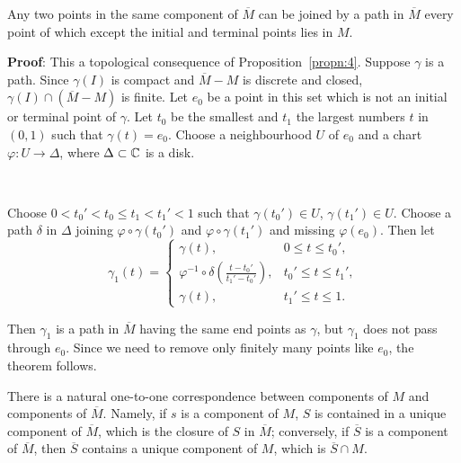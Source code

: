 \documentclass[a4paper,11pt]{article}
\begin{document}
\begin{propn}
  \label{propn:6}
  Any two points in the same component of $\overline{M}$ can be joined
  by a path in $\overline{M}$ every point of which except the initial
  and terminal points lies in $M$.
\end{propn}

\begin{mdframed}
  \textbf{Proof}: 
  This a topological consequence of Proposition~\ref{propn:4}.
  Suppose $\gamma$ is a path.  Since $\gamma(I)$ is compact and
  $\overline{M} - M$ is discrete and closed, $\gamma(I) \cap
  (\overline{M} - M)$ is finite.  Let $e_0$ be a point in this set
  which is not an initial or terminal point of $\gamma$.  Let $t_0$ be
  the smallest and $t_1$ the largest numbers $t$ in $(0,1)$ such that
  $\gamma(t) = e_0$.  Choose a neighbourhood $U$ of $e_0$ and a chart
  $\varphi : U \to \Delta$, where $\Delta \subset {\mathbb C}$ is a disk.

  \begin{center}
  \begin{minipage}{0.4\textwidth}
    ~
    \vspace*{4cm}
  \end{minipage}%
  \begin{minipage}{0.5\textwidth}
    Choose $0 < t_0' < t_0 \le t_1 < t_1' < 1$ such that $\gamma(t_0')
    \in U$, $\gamma(t_1') \in U$.  Choose a path $\delta$ in $\Delta$
    joining $\varphi \circ \gamma(t_0')$ and $\varphi \circ
    \gamma(t_1')$ and missing $\varphi(e_0)$.  Then let
    $$
    \gamma_1(t) =
    \begin{cases}
      \gamma(t), & 0 \le t \le t_0',\\
      \varphi^{-1} \circ \delta(\frac{t-t_0'}{t_1'-t_0'}),
      & t_0' \le t \le t_1',\\
      \gamma(t), & t_1' \le t \le 1.
    \end{cases}
    $$
  \end{minipage}
  \end{center}
  Then $\gamma_1$ is a path in $\overline{M}$ having the same end
  points as $\gamma$, but $\gamma_1$ does not pass through $e_0$.
  Since we need to remove only finitely many points like $e_0$, the
  theorem follows.
\end{mdframed}

\begin{propn}
  \label{propn:7}
  There is a natural one-to-one correspondence between components of
  $M$ and components of $\overline{M}$.  Namely, if $s$ is a component
  of $M$, $S$ is contained in a unique component of $\overline{M}$,
  which is the closure of $S$ in $\overline{M}$; conversely, if
  $\overline{S}$ is a component of $\overline{M}$, then $\overline{S}$
  contains a unique component of $M$, which is $\overline{S} \cap M$.
\end{propn}
\end{document}
